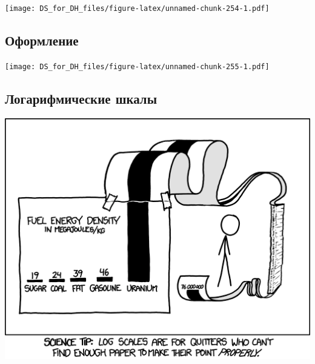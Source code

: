 \documentclass[
]{book}
\newenvironment{Shaded}{\begin{snugshade}}{\end{snugshade}}
\newcommand{\CommentTok}[1]{\textcolor[rgb]{0.56,0.35,0.01}{\textit{#1}}}
\newcommand{\DataTypeTok}[1]{\textcolor[rgb]{0.13,0.29,0.53}{#1}}
\newcommand{\KeywordTok}[1]{\textcolor[rgb]{0.13,0.29,0.53}{\textbf{#1}}}
\newcommand{\NormalTok}[1]{#1}
\newcommand{\OperatorTok}[1]{\textcolor[rgb]{0.81,0.36,0.00}{\textbf{#1}}}
\newcommand{\StringTok}[1]{\textcolor[rgb]{0.31,0.60,0.02}{#1}}
\begin{document}
\texttt{[image: DS\_for\_DH\_files/figure-latex/unnamed-chunk-254-1.pdf]}

\hypertarget{ux43eux444ux43eux440ux43cux43bux435ux43dux438ux435}{%
\subsection{Оформление}\label{ux43eux444ux43eux440ux43cux43bux435ux43dux438ux435}}

\begin{Shaded}
\end{Shaded}

\texttt{[image: DS\_for\_DH\_files/figure-latex/unnamed-chunk-255-1.pdf]}

\hypertarget{ux43bux43eux433ux430ux440ux438ux444ux43cux438ux447ux435ux441ux43aux438ux435-ux448ux43aux430ux43bux44b}{%
\subsection{Логарифмические шкалы}\label{ux43bux43eux433ux430ux440ux438ux444ux43cux438ux447ux435ux441ux43aux438ux435-ux448ux43aux430ux43bux44b}}

\includegraphics{images/log_scales.png}
\end{document}
